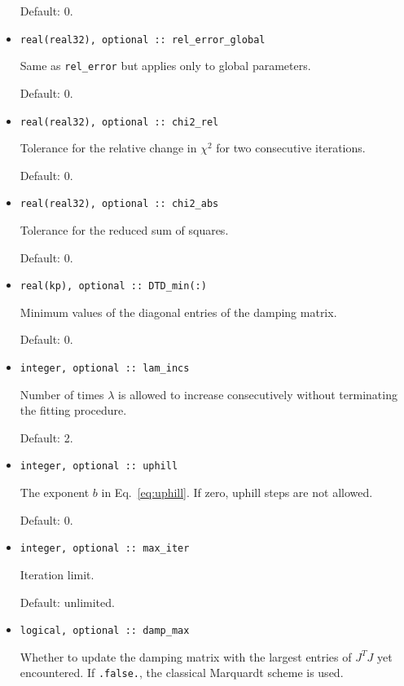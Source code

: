 \documentclass{article}
\begin{document}
\begin{itemize}
  Default: 0.
\item 
\begin{verbatim}
real(real32), optional :: rel_error_global
\end{verbatim}
  Same as \verb+rel_error+ but applies only to global parameters.

  Default: 0.
\item 
\begin{verbatim}
real(real32), optional :: chi2_rel
\end{verbatim}
  Tolerance for the relative change in $\chi^2$ for two consecutive
  iterations.

  Default: 0.
\item 
\begin{verbatim}
real(real32), optional :: chi2_abs
\end{verbatim}
  Tolerance for the reduced sum of squares.

  Default: 0.
\item 
\begin{verbatim}
real(kp), optional :: DTD_min(:)
\end{verbatim}
  Minimum values of the diagonal entries of the damping matrix.

  Default: 0.
\item 
\begin{verbatim}
integer, optional :: lam_incs
\end{verbatim}
  Number of times $\lambda$ is allowed to increase consecutively
  without terminating the fitting procedure.

  Default: 2.
\item 
\begin{verbatim}
integer, optional :: uphill
\end{verbatim}
  The exponent $b$ in Eq.~\eqref{eq:uphill}. If zero, uphill steps are
  not allowed.

  Default: 0.
\item 
\begin{verbatim}
integer, optional :: max_iter
\end{verbatim}
  Iteration limit.

  Default: unlimited.
\item 
\begin{verbatim}
logical, optional :: damp_max
\end{verbatim}
  Whether to update the damping matrix with the largest entries of
  $J^TJ$ yet encountered. If \texttt{.false.}, the classical Marquardt
  scheme is used.


\end{itemize}
\end{document}
